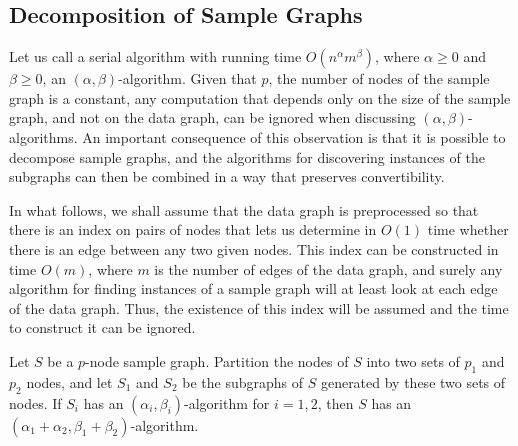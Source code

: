 \subsection{Decomposition of Sample Graphs}
\label{sg-decomp-subsect}

Let us call a serial algorithm with running time $O(n^{\alpha}m^{\beta})$, where $\alpha\ge 0$ and $\beta\ge 0$, an $(\alpha,\beta)$-algorithm.
Given that $p$, the number of nodes of the sample graph is a constant, any computation that depends only on the size of the sample graph, and not on the data graph, can be ignored when discussing $(\alpha,\beta)$-algorithms.
An important consequence of this observation is that it is possible to decompose sample graphs, and the algorithms for discovering instances of the subgraphs can then be combined in a way that preserves convertibility.

In what follows, we shall assume that the data graph is preprocessed so that there is an index on pairs of nodes that lets us determine in $O(1)$ time whether there is an edge between any two given nodes.  This index can be constructed in time $O(m)$, where $m$ is the number of edges of the data graph, and surely any algorithm for finding instances of a sample graph will at least look at each edge of the data graph.  Thus, the existence of this index will be assumed and the time to construct it can be ignored.

\begin{lemma}
\label{a-b-lemma}
Let $S$ be a $p$-node sample graph.  Partition the nodes of $S$ into two sets of $p_1$ and $p_2$ nodes, and let $S_1$ and $S_2$ be the subgraphs of $S$ generated by these two sets of nodes.  If $S_i$ has an $(\alpha_i,\beta_i)$-algorithm for $i=1,2$, then $S$ has an $(\alpha_1+\alpha_2,\beta_1+\beta_2)$-algorithm.
\end{lemma}

